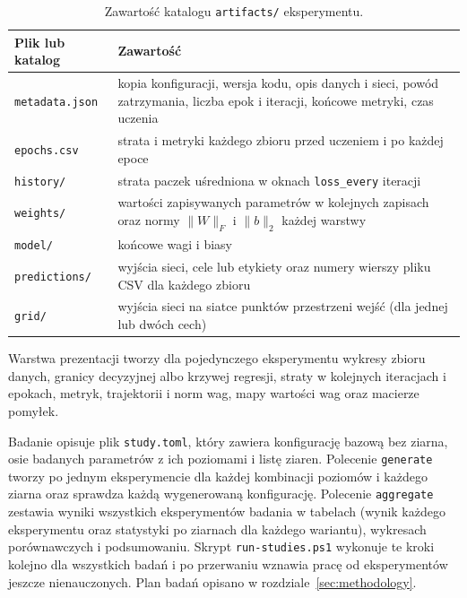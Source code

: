 \begin{table}[H]
    \centering
    \caption{Zawartość katalogu \texttt{artifacts/} eksperymentu.}
    \label{tab:artifacts}
    \begin{tabularx}{\textwidth}{lX}
        \toprule
        Plik lub katalog & Zawartość \\
        \midrule
        \texttt{metadata.json} & kopia konfiguracji, wersja kodu, opis danych i sieci, powód zatrzymania, liczba epok i iteracji, końcowe metryki, czas uczenia \\
        \texttt{epochs.csv} & strata i metryki każdego zbioru przed uczeniem i po każdej epoce \\
        \texttt{history/} & strata paczek uśredniona w oknach \texttt{loss\_every} iteracji \\
        \texttt{weights/} & wartości zapisywanych parametrów w kolejnych zapisach oraz normy $\lVert W \rVert_F$ i $\lVert b \rVert_2$ każdej warstwy \\
        \texttt{model/} & końcowe wagi i biasy \\
        \texttt{predictions/} & wyjścia sieci, cele lub etykiety oraz numery wierszy pliku CSV dla każdego zbioru \\
        \texttt{grid/} & wyjścia sieci na siatce punktów przestrzeni wejść (dla jednej lub dwóch cech) \\
        \bottomrule
    \end{tabularx}
\end{table}

Warstwa prezentacji tworzy dla pojedynczego eksperymentu wykresy zbioru danych, granicy decyzyjnej albo krzywej regresji, straty w kolejnych iteracjach i epokach, metryk, trajektorii i norm wag, mapy wartości wag oraz macierze pomyłek.

Badanie opisuje plik \texttt{study.toml}, który zawiera konfigurację bazową bez ziarna, osie badanych parametrów z ich poziomami i listę ziaren. Polecenie \texttt{generate} tworzy po jednym eksperymencie dla każdej kombinacji poziomów i każdego ziarna oraz sprawdza każdą wygenerowaną konfigurację. Polecenie \texttt{aggregate} zestawia wyniki wszystkich eksperymentów badania w tabelach (wynik każdego eksperymentu oraz statystyki po ziarnach dla każdego wariantu), wykresach porównawczych i podsumowaniu. Skrypt \texttt{run-studies.ps1} wykonuje te kroki kolejno dla wszystkich badań i po przerwaniu wznawia pracę od eksperymentów jeszcze nienauczonych. Plan badań opisano w rozdziale~\ref{sec:methodology}.

